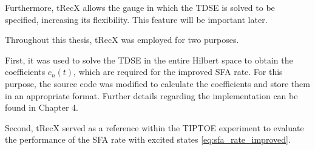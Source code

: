 Furthermore, tRecX allows the gauge in which the TDSE is solved to be specified, increasing its flexibility.
This feature will be important later.

\medskip
Throughout this thesis, tRecX was employed for two purposes.

First, it was used to solve the TDSE in the entire Hilbert space to obtain the coefficients $c_n(t)$, which are required for the improved SFA rate.
For this purpose, the source code was modified to calculate the coefficients and store them in an appropriate format.
Further details regarding the implementation can be found in Chapter 4.

Second, tRecX served as a reference within the TIPTOE experiment to evaluate the performance of the SFA rate with excited states \eqref{eq:sfa_rate_improved}.









